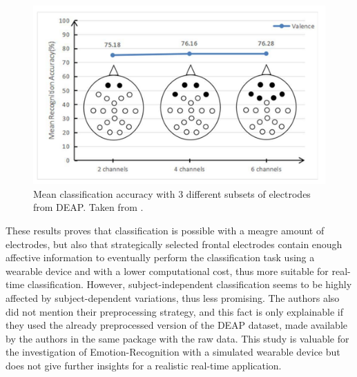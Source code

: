 \begin{figure}[h!]
\includegraphics[width=12cm]{img/related_work/wu_electrodes.png}
\centering
\caption{Mean classification accuracy with 3 different subsets of electrodes from DEAP. Taken from  \cite{wu_estimation_2017}.}\label{fig_wu_electrodes}
\end{figure}


These results proves that classification is possible with a meagre amount of electrodes, but also that strategically selected frontal electrodes contain enough affective information to eventually perform the classification task using a wearable device and with a lower computational cost, thus more suitable for real-time classification. However, subject-independent classification seems to be highly affected by subject-dependent variations, thus less promising. The authors also did not mention their preprocessing strategy, and this fact is only explainable if they used the already preprocessed version of the DEAP dataset, made available by the authors in the same package with the raw data. This study is valuable for the investigation of Emotion-Recognition with a simulated wearable device but does not give further insights for a realistic real-time application.




